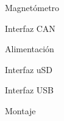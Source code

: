 \begin{frame}{Magnetómetro}

\end{frame}

\begin{frame}{Interfaz CAN}

\end{frame}

\begin{frame}{Alimentación} %

\end{frame}

\begin{frame}{Interfaz uSD} %

\end{frame}

\begin{frame}{Interfaz USB} %

\end{frame}

\begin{frame}{Montaje} %

\end{frame}